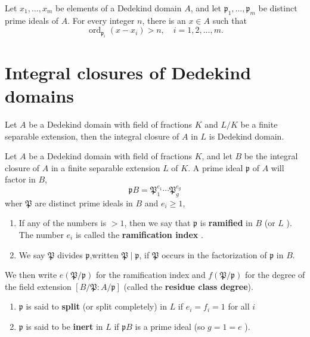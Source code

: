 \begin{proposition}
    Let $x_1, \ldots, x_m$ be elements of a Dedekind domain $A$, and let $\mathfrak{p}_1, \ldots, \mathfrak{p}_m$ be distinct prime ideals of $A$. For every integer $n$, there is an $x \in A$ such that
    \begin{equation*}
        \operatorname{ord}_{\mathfrak{p}_i}\left(x-x_i\right)>n, \quad i=1,2, \ldots, m .
    \end{equation*}
\end{proposition}


\section{Integral closures of Dedekind domains}

\begin{theorem}
    Let $A$ be a Dedekind domain with field of fractions $K$ and $L/K$ be a finite separable extension, then the integral closure of $A$ in $L$ is Dedekind domain.
\end{theorem}


\begin{definition}
    Let $A$ be a Dedekind domain with field of fractions $K$, and let $B$ be the integral closure of $A$ in a finite separable extension $L$ of $K$.
    A prime ideal $\mathfrak{p}$ of $A$ will factor in $B$,
    \begin{equation*}
        \mathfrak{p} B=\mathfrak{P}_1^{e_1} \cdots \mathfrak{P}_g^{e_g}
    \end{equation*}
    wher $\mathfrak{P}$ are distinct prime ideals in $B$ and $e_i\geq 1$,
    \begin{enumerate}
        \item
              If any of the numbers is $>1$, then we say that $\mathfrak{p}$ is \textbf{ramified} in $B$ (or $L$ ).
              The number $e_i$ is called the \textbf{ramification index} .

        \item
              We say $\mathfrak{P}$ divides $\mathfrak{p}$,written $\mathfrak{P} \mid \mathfrak{p}$, if $\mathfrak{P}$ occurs in the factorization of $\mathfrak{p}$ in $B$.
    \end{enumerate}
    We then write $e(\mathfrak{P} / \mathfrak{p})$ for the ramification index and $f(\mathfrak{P} / \mathfrak{p})$ for the degree of the field extension $[B / \mathfrak{P}: A / \mathfrak{p}]$ (called the \textbf{residue class degree}).
    \begin{enumerate}[resume]
        \item
              $\mathfrak{p}$ is said to \textbf{split} (or split completely) in $L$ if $e_i=f_i=1$ for all $i$

        \item
              $\mathfrak{p}$ is said to be \textbf{inert} in $L$ if $\mathfrak{p} B$ is a prime ideal (so $g=1=e$ ).
    \end{enumerate}
\end{definition}


